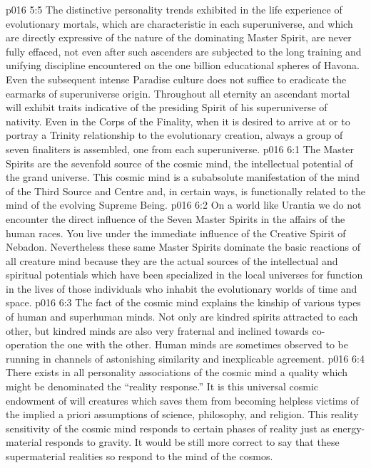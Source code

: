 \vs p016 5:5 The distinctive personality trends exhibited in the life experience of evolutionary mortals, which are characteristic in each superuniverse, and which are directly expressive of the nature of the dominating Master Spirit, are never fully effaced, not even after such ascenders are subjected to the long training and unifying discipline encountered on the one billion educational spheres of Havona. Even the subsequent intense Paradise culture does not suffice to eradicate the earmarks of superuniverse origin. Throughout all eternity an ascendant mortal will exhibit traits indicative of the presiding Spirit of his superuniverse of nativity. Even in the Corps of the Finality, when it is desired to arrive at or to portray a  Trinity relationship to the evolutionary creation, always a group of seven finaliters is assembled, one from each superuniverse.
\vs p016 6:1 The Master Spirits are the sevenfold source of the cosmic mind, the intellectual potential of the grand universe. This cosmic mind is a subabsolute manifestation of the mind of the Third Source and Centre and, in certain ways, is functionally related to the mind of the evolving Supreme Being.
\vs p016 6:2 On a world like Urantia we do not encounter the direct influence of the Seven Master Spirits in the affairs of the human races. You live under the immediate influence of the Creative Spirit of Nebadon. Nevertheless these same Master Spirits dominate the basic reactions of all creature mind because they are the actual sources of the intellectual and spiritual potentials which have been specialized in the local universes for function in the lives of those individuals who inhabit the evolutionary worlds of time and space.
\vs p016 6:3 The fact of the cosmic mind explains the kinship of various types of human and superhuman minds. Not only are kindred spirits attracted to each other, but kindred minds are also very fraternal and inclined towards co\hyp{}operation the one with the other. Human minds are sometimes observed to be running in channels of astonishing similarity and inexplicable agreement.
\vs p016 6:4 \pc There exists in all personality associations of the cosmic mind a quality which might be denominated the “reality response.” It is this universal cosmic endowment of will creatures which saves them from becoming helpless victims of the implied a priori assumptions of science, philosophy, and religion. This reality sensitivity of the cosmic mind responds to certain phases of reality just as energy\hyp{}material responds to gravity. It would be still more correct to say that these supermaterial realities so respond to the mind of the cosmos.

